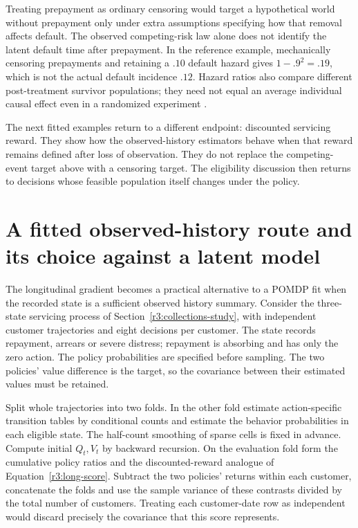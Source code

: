 Treating prepayment as ordinary censoring would target a hypothetical
world without prepayment only under extra assumptions specifying how
that removal affects default. The observed competing-risk law alone
does not identify the latent default time after prepayment. In the
reference example, mechanically censoring prepayments and retaining
a $.10$ default hazard gives $1-.9^2=.19$, which is not the actual
default incidence $.12$. Hazard ratios also compare different
post-treatment survivor populations; they need not equal an average
individual causal effect even in a randomized experiment
\citep[Technical Point 8.1 and Section 17.2]{hernan2020}.

The next fitted examples return to a different endpoint: discounted
servicing reward. They show how the observed-history estimators behave
when that reward remains defined after loss of observation. They do not
replace the competing-event target above with a censoring target. The
eligibility discussion then returns to decisions whose feasible population
itself changes under the policy.



\section{A fitted observed-history route and its choice against a latent model}
\label{s4:fitted-history}
The longitudinal gradient becomes a practical alternative to a POMDP fit
when the recorded state is a sufficient observed history summary. Consider
the three-state servicing process of Section~\ref{r3:collections-study},
with independent customer trajectories and eight decisions per customer.
The state records repayment, arrears or severe distress; repayment is
absorbing and has only the zero action. The policy probabilities are
specified before sampling. The two policies' value difference is the
target, so the covariance between their estimated values must be retained.

Split whole trajectories into two folds. In the other fold estimate
action-specific transition tables by conditional counts and estimate
the behavior probabilities in each eligible state. The half-count
smoothing of sparse cells is fixed in advance. Compute initial $Q_t,V_t$
by backward recursion. On the evaluation fold form the cumulative policy
ratios and the discounted-reward analogue of Equation~\eqref{r3:long-score}.
Subtract the two policies' returns within each customer, concatenate the
folds and use the sample variance of these contrasts divided by the total
number of customers. Treating each customer-date row as independent would
discard precisely the covariance that this score represents.

